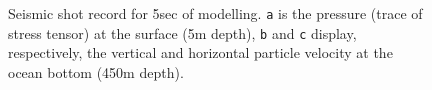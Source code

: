 \documentclass[conference]{IEEEtran}
\begin{document}
\begin{figure}
\centering
\captionsetup[subfigure]{labelformat=empty}
\caption{Seismic shot record for 5sec of modelling. \texttt{a} is the
pressure (trace of stress tensor) at the surface (5m depth), \texttt{b}
and \texttt{c} display, respectively, the vertical and horizontal
particle velocity at the ocean bottom (450m depth).}\label{ElasShot}
\end{figure}
\end{document}
